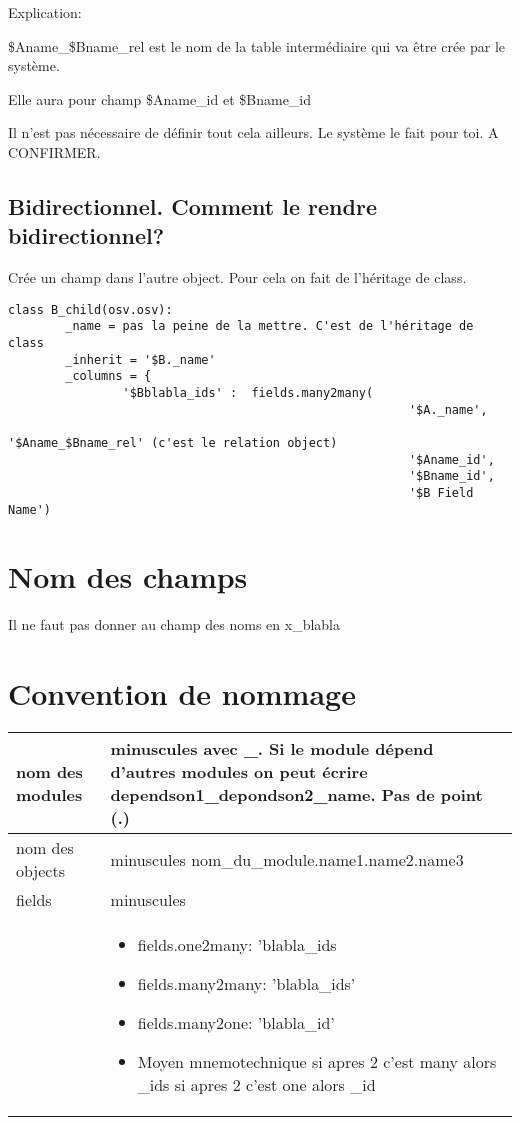 \documentclass[12pt,a4paper]{article}
\begin{document}
Explication:

\$Aname\_\$Bname\_rel est le nom de la table intermédiaire qui va être crée par le système.

Elle aura pour champ \$Aname\_id et \$Bname\_id

Il n'est pas nécessaire de définir tout cela ailleurs. Le système le fait pour toi. A CONFIRMER.

\subsection{Bidirectionnel. Comment le rendre bidirectionnel?}
\label{sec:bidirectionnel}

Crée un champ dans l'autre object. Pour cela on fait de l'héritage de class.

\begin{verbatim}
class B_child(osv.osv):
        _name = pas la peine de la mettre. C'est de l'héritage de class
        _inherit = '$B._name'
        _columns = {
                '$Bblabla_ids' :  fields.many2many(
                                                        '$A._name',
                                                        '$Aname_$Bname_rel' (c'est le relation object)
                                                        '$Aname_id',
                                                        '$Bname_id',
                                                        '$B Field Name')
\end{verbatim}

\section{Nom des champs}
\label{sec:nomchamp}

Il ne faut pas donner au champ des noms en x\_blabla

\section{Convention de nommage}
\label{sec:nommage}

\begin{tabular}{|l|l|}
\hline
  nom des modules & minuscules avec \_. Si le module dépend d'autres modules on peut écrire dependson1\_depondson2\_name. Pas de point (.)\\
\hline
nom des objects & minuscules  nom\_du\_module.name1.name2.name3 \\
\hline
fields & minuscules \\
&{\parbox{0.9\textwidth}{
\begin{itemize}
\item fields.one2many: 'blabla\_ids
\item fields.many2many: 'blabla\_ids'
\item fields.many2one: 'blabla\_id'
\item Moyen mnemotechnique si apres 2 c'est many alors \_ids si apres 2 c'est one alors \_id
\end{itemize} }}\\
\hline
\end{tabular}
\end{document}
